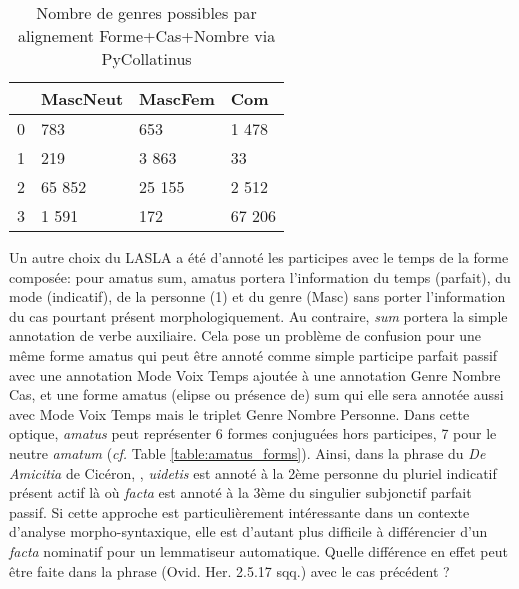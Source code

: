 \begin{table}[]
\centering
\begin{tabular}{l|lll}
\toprule
         & MascNeut & MascFem & Com    \\ \midrule
0        & 783      & 653     & 1 478  \\
1        & 219      & 3 863   & 33     \\
2        & 65 852   & 25 155  & 2 512  \\
3        & 1 591    & 172     & 67 206 \\ \bottomrule
\end{tabular}
\caption{Nombre de genres possibles par alignement Forme+Cas+Nombre via PyCollatinus}
\label{table:lasla:genders-alignement}
\end{table}

\newpara

Un autre choix du LASLA a été d'annoté les participes avec le temps de la forme composée: pour amatus sum, amatus portera l'information du temps (parfait), du mode (indicatif), de la personne (1) et du genre (Masc) sans porter l'information du cas pourtant présent morphologiquement. Au contraire, \textit{sum} portera la simple annotation de verbe auxiliaire. Cela pose un problème de confusion pour une même forme amatus qui peut être annoté comme simple participe parfait passif avec une annotation Mode Voix Temps ajoutée à une annotation Genre Nombre Cas, et une forme amatus (elipse ou présence de) sum qui elle sera annotée aussi avec Mode Voix Temps mais le triplet Genre Nombre Personne. Dans cette optique, \textit{amatus} peut représenter 6 formes conjuguées hors participes, 7 pour le neutre \textit{amatum} (\textit{cf.} Table \ref{table:amatus_forms}). %
%
%
Ainsi, dans la phrase du \textit{De Amicitia} de Cicéron, , \textit{uidetis} est annoté à la 2ème personne du pluriel indicatif présent actif là où \textit{facta} est annoté à la 3ème du singulier subjonctif parfait passif. Si cette approche est particulièrement intéressante dans un contexte d'analyse morpho-syntaxique, elle est d'autant plus difficile à différencier d'un \textit{facta} nominatif pour un lemmatiseur automatique. Quelle différence en effet peut être faite dans la phrase  (Ovid. Her. 2.5.17 sqq.) avec le cas précédent ? %

